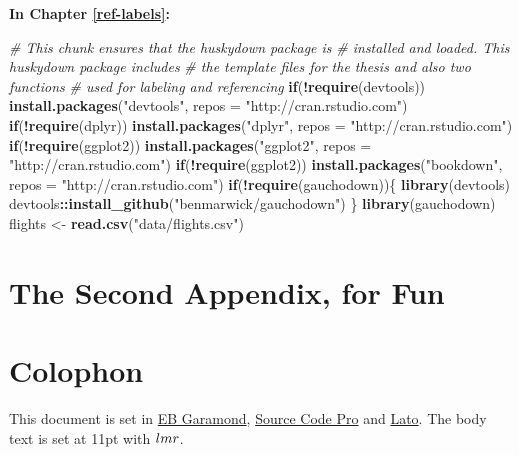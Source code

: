 \documentclass[twoside,12pt,final]{ucthesis-CA2012}
\newenvironment{Shaded}{}{}
\newcommand{\KeywordTok}[1]{\textcolor[rgb]{0.00,0.44,0.13}{\textbf{{#1}}}}
\newcommand{\DataTypeTok}[1]{\textcolor[rgb]{0.56,0.13,0.00}{{#1}}}
\newcommand{\StringTok}[1]{\textcolor[rgb]{0.25,0.44,0.63}{{#1}}}
\newcommand{\CommentTok}[1]{\textcolor[rgb]{0.38,0.63,0.69}{\textit{{#1}}}}
\newcommand{\NormalTok}[1]{{#1}}
\newcommand{\OperatorTok}[1]{\textcolor[rgb]{0.00,0.44,0.13}{\textbf{{#1}}}}
\newcommand{\ControlFlowTok}[1]{\textcolor[rgb]{0.00,0.44,0.13}{\textbf{{#1}}}}
\begin{document}
\begin{ucmainmatter}
\textbf{In Chapter \ref{ref-labels}:}
\begin{Shaded}
\begin{Highlighting}[]
\CommentTok{# This chunk ensures that the huskydown package is}
\CommentTok{# installed and loaded. This huskydown package includes}
\CommentTok{# the template files for the thesis and also two functions}
\CommentTok{# used for labeling and referencing}
\ControlFlowTok{if}\NormalTok{(}\OperatorTok{!}\KeywordTok{require}\NormalTok{(devtools))}
  \KeywordTok{install.packages}\NormalTok{(}\StringTok{"devtools"}\NormalTok{, }\DataTypeTok{repos =} \StringTok{"http://cran.rstudio.com"}\NormalTok{)}
\ControlFlowTok{if}\NormalTok{(}\OperatorTok{!}\KeywordTok{require}\NormalTok{(dplyr))}
    \KeywordTok{install.packages}\NormalTok{(}\StringTok{"dplyr"}\NormalTok{, }\DataTypeTok{repos =} \StringTok{"http://cran.rstudio.com"}\NormalTok{)}
\ControlFlowTok{if}\NormalTok{(}\OperatorTok{!}\KeywordTok{require}\NormalTok{(ggplot2))}
    \KeywordTok{install.packages}\NormalTok{(}\StringTok{"ggplot2"}\NormalTok{, }\DataTypeTok{repos =} \StringTok{"http://cran.rstudio.com"}\NormalTok{)}
\ControlFlowTok{if}\NormalTok{(}\OperatorTok{!}\KeywordTok{require}\NormalTok{(ggplot2))}
    \KeywordTok{install.packages}\NormalTok{(}\StringTok{"bookdown"}\NormalTok{, }\DataTypeTok{repos =} \StringTok{"http://cran.rstudio.com"}\NormalTok{)}
\ControlFlowTok{if}\NormalTok{(}\OperatorTok{!}\KeywordTok{require}\NormalTok{(gauchodown))\{}
  \KeywordTok{library}\NormalTok{(devtools)}
\NormalTok{  devtools}\OperatorTok{::}\KeywordTok{install_github}\NormalTok{(}\StringTok{"benmarwick/gauchodown"}\NormalTok{)}
\NormalTok{  \}}
\KeywordTok{library}\NormalTok{(gauchodown)}
\NormalTok{flights <-}\StringTok{ }\KeywordTok{read.csv}\NormalTok{(}\StringTok{"data/flights.csv"}\NormalTok{)}
\end{Highlighting}
\end{Shaded}
\hypertarget{the-second-appendix-for-fun}{%
\chapter{The Second Appendix, for Fun}\label{the-second-appendix-for-fun}}

\hypertarget{colophon}{%
\chapter*{Colophon}\label{colophon}}

This document is set in \href{https://github.com/georgd/EB-Garamond}{EB Garamond}, \href{https://github.com/adobe-fonts/source-code-pro/}{Source Code Pro} and \href{http://www.latofonts.com/lato-free-fonts/}{Lato}. The body text is set at 11pt with \(\familydefault\).


\end{ucmainmatter}
\end{document}
